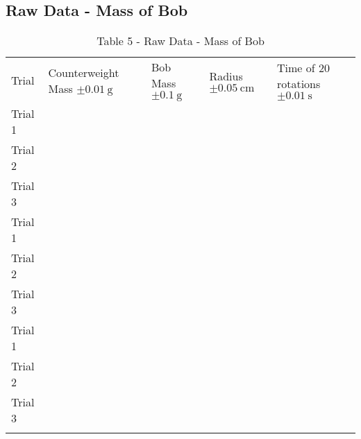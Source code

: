 \documentclass{lab}
\begin{document}
	\noindent\begin{minipage}{\textwidth}
    \subsection{Raw Data - Mass of Bob}
    \vspace{-0.2cm}
	\renewcommand{\arraystretch}{1.1}
        \begin{table}[H]
            \centering
            \begin{tabular}{l|llll}
		    	\dtoprule
				Trial		& Counterweight Mass $\pm \SI{0.01}{\gram}$		& Bob Mass $\pm \SI{0.1}{\gram}$		& Radius $\pm \SI{0.05}{\cm}$		& Time of 20 rotations $\pm \SI{0.01}{\second}$	\\
				Trial 1		&&&&\\
				Trial 2		&&&&\\
				Trial 3		&&&&\\
				\hline
				Trial 1		&&&&\\
				Trial 2		&&&&\\
				Trial 3		&&&&\\
				\hline
				Trial 1		&&&&\\
				Trial 2		&&&&\\
				Trial 3		&&&&\\
	    	    \dbottomrule
	    \end{tabular}
	    \caption{Table 5 - Raw Data - Mass of Bob}
	    \label{table: raw-data2}
	\end{table}
	\end{minipage}
\end{document}
